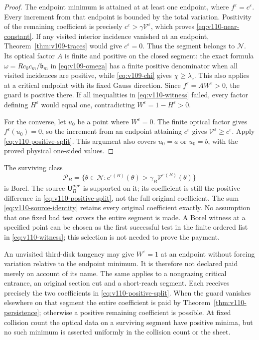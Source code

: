 \begin{proof}
The endpoint minimum is attained at at least one endpoint, where
$f^\varepsilon=c^\varepsilon$. Every increment from that endpoint
is bounded by the total variation. Positivity of the remaining
coefficient is precisely $c^\varepsilon>\gamma\mathcal V^\varepsilon$,
which proves \eqref{eq:v110-near-constant}. If any visited interior
incidence vanished at an endpoint, Theorem~\ref{thm:v109-traces}
would give $c^\varepsilon=0$. Thus the segment belongs to
$\mathcal N$. Its optical factor $A$ is finite and positive on the
closed segment: the exact formula $\omega=Rc_0c_m/\mathfrak b_m$
in \eqref{eq:v109-omega} has a finite positive denominator when all
visited incidences are positive, while \eqref{eq:v109-chi} gives
$\chi\ge\lambda_\circ$. This also applies at a critical endpoint
with its fixed Gauss direction. Since $f^\varepsilon=AW^\varepsilon>0$, the guard
is positive there. If all inequalities in \eqref{eq:v110-witness}
failed, every factor defining $H^\varepsilon$ would equal one,
contradicting $W^\varepsilon=1-H^\varepsilon>0$.

For the converse, let $u_0$ be a point where $W^\varepsilon=0$.
The finite optical factor gives $f^\varepsilon(u_0)=0$, so the
increment from an endpoint attaining $c^\varepsilon$ gives
$\mathcal V^\varepsilon\ge c^\varepsilon$. Apply
\eqref{eq:v110-positive-split}. This argument also covers $u_0=a$
or $u_0=b$, with the proved physical one-sided values.
\end{proof}

The surviving class
\begin{equation}\label{eq:v110-persistent-class}
 \mathcal P_B=\{\theta\in\mathcal N:
       c^{\varepsilon(B)}(\theta)>
                      \gamma_B\mathcal V^{\varepsilon(B)}(\theta)\}
\end{equation}
is Borel. The source $\mathsf U_B^{\rm per}$ is supported on it;
its coefficient is still the positive difference in
\eqref{eq:v110-positive-split}, not the full original coefficient.
The sum \eqref{eq:v110-source-identity} retains every original
coefficient exactly. No assumption that one fixed bad test covers
the entire segment is made. A Borel witness at a specified point
can be chosen as the first successful test in the finite ordered
list in \eqref{eq:v110-witness}; this selection is not needed to
prove the payment.

\begin{remark}
An unvisited third-disk tangency may give $W^\varepsilon=1$ at an
endpoint without forcing variation relative to the endpoint minimum.
It is therefore not declared paid merely on account of its name.
The same applies to a nongrazing critical entrance, an original
section cut and a short-reach segment. Each receives precisely the
two coefficients in \eqref{eq:v110-positive-split}. When the guard
vanishes elsewhere on that segment the entire coefficient is paid
by Theorem~\ref{thm:v110-persistence}; otherwise a positive remaining
coefficient is possible. At fixed collision count the optical data
on a surviving segment have positive minima, but no such minimum
is asserted uniformly in the collision count or the sheet.
\end{remark}

